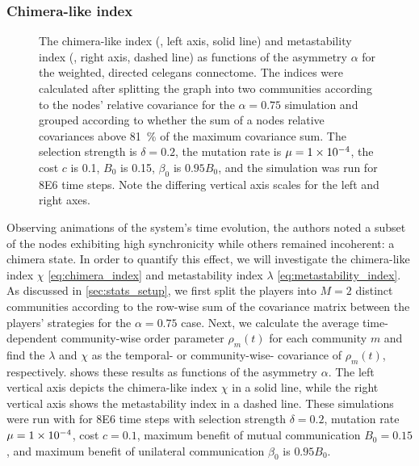 \documentclass[pdflatex,lineno,referee,sn-mathphys-ay]{sn-jnl}
\begin{document}
\subsubsection{Chimera-like index}
\begin{figure}
  \centering
  \pgfplotsset{width=0.4\textwidth}
  
  \caption{
    The chimera-like index (, left axis, solid line)
    and metastability index (,
    right axis, dashed line)
    as functions of the asymmetry $\alpha$
    for the
    weighted, directed \gls{celegans} connectome.
    The indices were calculated after splitting the graph
    into two communities according to the nodes' relative covariance
    for the $\alpha = \num{0.75}$ simulation
    and grouped according to whether the sum
    of a nodes relative covariances above
    \SI{81}{\percent} of the maximum covariance sum.
    The selection strength is $\delta=0.2$,
    the mutation rate is $\mu=\num{1E-4}$,
    the cost $c$ is \num{0.1},
    $B_0$ is \num{0.15},
    $\beta_0$ is $\num{0.95} B_0$,
    and the simulation was run for \num{8E6} time steps.
    Note the differing vertical axis scales
    for the left and right axes.
  }
  \label{fig:chimera-index}
\end{figure}

Observing animations of the system's time evolution,
the authors noted a subset of the nodes exhibiting high synchronicity
while others remained incoherent: a chimera state.
In order to quantify this effect, we will investigate
the chimera-like index $\chi$ \cref{eq:chimera_index}
and metastability index $\lambda$ \cref{eq:metastability_index}.
As discussed in \cref{sec:stats_setup},
we first split the players into $M=2$ distinct communities
according to the row-wise sum of the covariance matrix
between the players' strategies for the $\alpha = \num{0.75}$ case.
Next, we calculate the average time-dependent community-wise
order parameter $\rho_m(t)$
for each community $m$ and find the $\lambda$ and $\chi$
as the temporal- or community-wise- covariance of
$\rho_m(t)$, respectively.
 shows these results
as functions of the asymmetry $\alpha$.
The left vertical axis depicts the chimera-like index $\chi$
in a solid line,
while the right vertical axis shows the metastability index
in a dashed line.
These simulations were run with
for \num{8E6} time steps with
selection strength $\delta = 0.2$,
mutation rate $\mu=\num{1E-4}$,
cost $c = \num{0.1}$,
maximum benefit of mutual communication $B_0 = 0.15$,
and maximum benefit of unilateral communication $\beta_0$ is $\num{0.95} B_0$.
\end{document}
